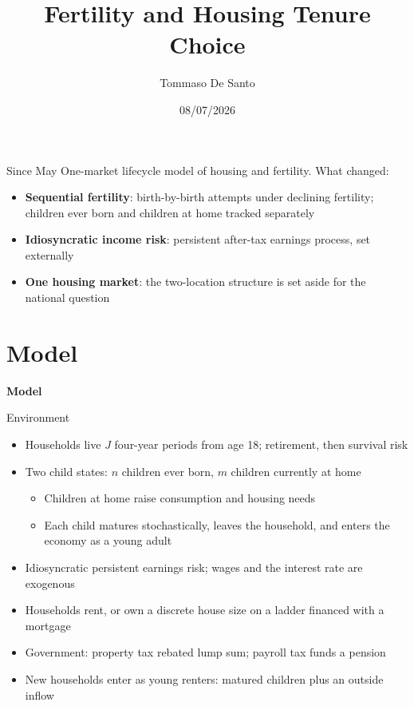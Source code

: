 \documentclass[11pt,aspectratio=169]{beamer}
\title{Fertility and Housing Tenure Choice}
\author{Tommaso De Santo}
\date{08/07/2026}
\begin{document}
{
\maketitle
}

\begin{frame}{Since May}
One-market lifecycle model of housing and fertility. What changed:
\begin{itemize}
  \item \textbf{Sequential fertility}: birth-by-birth attempts under declining fertility; children ever born and children at home tracked separately
  \item \textbf{Idiosyncratic income risk}: persistent after-tax earnings process, set externally
  \item \textbf{One housing market}: the two-location structure is set aside for the national question
\end{itemize}
\end{frame}

\section{Model}

\begin{frame}
\centering
{\Large\textbf{Model}}
\end{frame}

\begin{frame}{Environment}
\begin{itemize}
  \item Households live $J$ four-year periods from age 18; retirement, then survival risk
  \item Two child states: $n$ children ever born, $m$ children currently at home
  \begin{itemize}
    \item Children at home raise consumption and housing needs
    \item Each child matures stochastically, leaves the household, and enters the economy as a young adult
  \end{itemize}
  \item Idiosyncratic persistent earnings risk; wages and the interest rate are exogenous
  \item Households rent, or own a discrete house size on a ladder financed with a mortgage
  \item Government: property tax rebated lump sum; payroll tax funds a pension
  \item New households enter as young renters: matured children plus an outside inflow
\end{itemize}
\end{frame}
\end{document}
